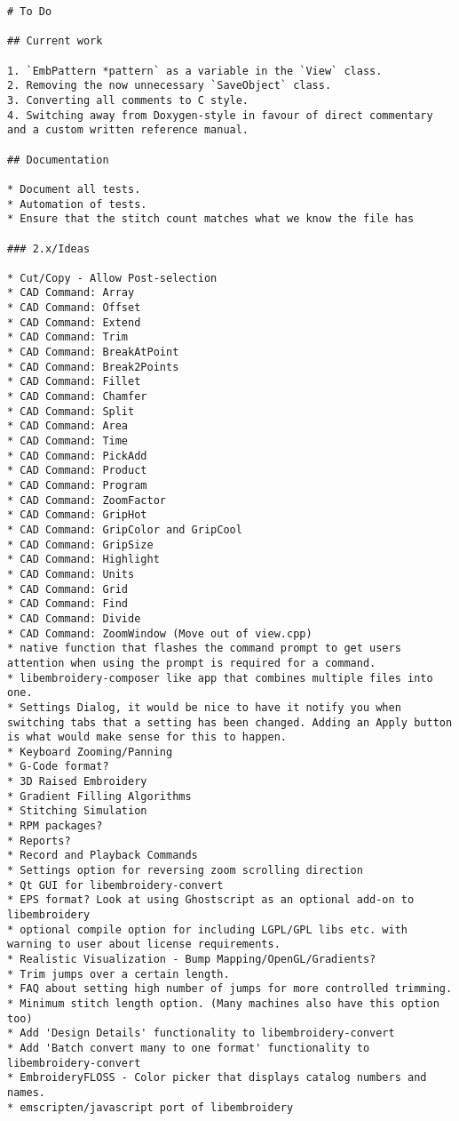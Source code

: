 \begin{verbatim}
# To Do

## Current work

1. `EmbPattern *pattern` as a variable in the `View` class.
2. Removing the now unnecessary `SaveObject` class.
3. Converting all comments to C style.
4. Switching away from Doxygen-style in favour of direct commentary and a custom written reference manual.

## Documentation

* Document all tests.
* Automation of tests.
* Ensure that the stitch count matches what we know the file has

### 2.x/Ideas

* Cut/Copy - Allow Post-selection
* CAD Command: Array
* CAD Command: Offset
* CAD Command: Extend
* CAD Command: Trim
* CAD Command: BreakAtPoint
* CAD Command: Break2Points
* CAD Command: Fillet
* CAD Command: Chamfer
* CAD Command: Split
* CAD Command: Area
* CAD Command: Time
* CAD Command: PickAdd
* CAD Command: Product
* CAD Command: Program
* CAD Command: ZoomFactor
* CAD Command: GripHot
* CAD Command: GripColor and GripCool
* CAD Command: GripSize
* CAD Command: Highlight
* CAD Command: Units
* CAD Command: Grid
* CAD Command: Find
* CAD Command: Divide
* CAD Command: ZoomWindow (Move out of view.cpp)
* native function that flashes the command prompt to get users attention when using the prompt is required for a command.
* libembroidery-composer like app that combines multiple files into one.
* Settings Dialog, it would be nice to have it notify you when switching tabs that a setting has been changed. Adding an Apply button is what would make sense for this to happen.
* Keyboard Zooming/Panning
* G-Code format?
* 3D Raised Embroidery
* Gradient Filling Algorithms
* Stitching Simulation
* RPM packages?
* Reports?
* Record and Playback Commands
* Settings option for reversing zoom scrolling direction
* Qt GUI for libembroidery-convert
* EPS format? Look at using Ghostscript as an optional add-on to libembroidery
* optional compile option for including LGPL/GPL libs etc. with warning to user about license requirements.
* Realistic Visualization - Bump Mapping/OpenGL/Gradients?
* Trim jumps over a certain length.
* FAQ about setting high number of jumps for more controlled trimming.
* Minimum stitch length option. (Many machines also have this option too)
* Add 'Design Details' functionality to libembroidery-convert
* Add 'Batch convert many to one format' functionality to libembroidery-convert
* EmbroideryFLOSS - Color picker that displays catalog numbers and names.
* emscripten/javascript port of libembroidery


\end{verbatim}
